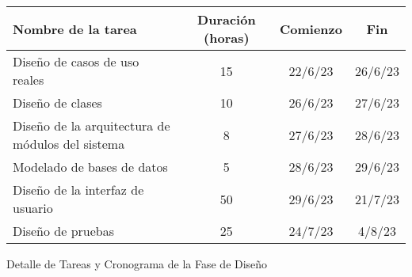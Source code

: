 \begin{planificacion}
	\centering
	\begin{tabular}{ | m{9cm} | c | c | c | }
		\hline
		\textbf{Nombre de la tarea}                      & \textbf{Duración (horas)} & \textbf{Comienzo} & \textbf{Fin} \\\hline
		Diseño de casos de uso reales                    & 15                        & 22/6/23           & 26/6/23      \\\hline
		Diseño de clases                                 & 10                        & 26/6/23           & 27/6/23      \\\hline
		Diseño de la arquitectura de módulos del sistema & 8                         & 27/6/23           & 28/6/23      \\\hline
		Modelado de bases de datos                       & 5                         & 28/6/23           & 29/6/23      \\\hline
		Diseño de la interfaz de usuario                 & 50                        & 29/6/23           & 21/7/23      \\\hline
		Diseño de pruebas                                & 25                        & 24/7/23           & 4/8/23       \\\hline
	\end{tabular}
	\caption{Detalle de Tareas y Cronograma de la Fase de Diseño}
\end{planificacion}